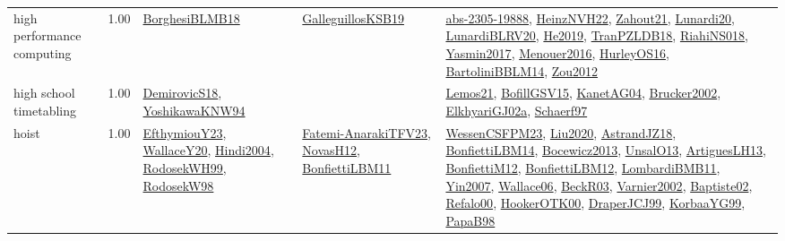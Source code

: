 {\begin{longtable}{p{3cm}r>{\raggedright\arraybackslash}p{6cm}>{\raggedright\arraybackslash}p{6cm}>{\raggedright\arraybackslash}p{8cm}}
\index{high performance computing}\index{ApplicationAreas!high performance computing}high performance computing &  1.00 & \hyperref[detail:BorghesiBLMB18]{BorghesiBLMB18} & \hyperref[detail:GalleguillosKSB19]{GalleguillosKSB19} & \hyperref[detail:abs-2305-19888]{abs-2305-19888}, \hyperref[detail:HeinzNVH22]{HeinzNVH22}, \hyperref[detail:Zahout21]{Zahout21}, \hyperref[detail:Lunardi20]{Lunardi20}, \hyperref[detail:LunardiBLRV20]{LunardiBLRV20}, \hyperref[detail:He2019]{He2019}, \hyperref[detail:TranPZLDB18]{TranPZLDB18}, \hyperref[detail:RiahiNS018]{RiahiNS018}, \hyperref[detail:Yasmin2017]{Yasmin2017}, \hyperref[detail:Menouer2016]{Menouer2016}, \hyperref[detail:HurleyOS16]{HurleyOS16}, \hyperref[detail:BartoliniBBLM14]{BartoliniBBLM14}, \hyperref[detail:Zou2012]{Zou2012}\\
\index{high school timetabling}\index{ApplicationAreas!high school timetabling}high school timetabling &  1.00 & \hyperref[detail:DemirovicS18]{DemirovicS18}, \hyperref[detail:YoshikawaKNW94]{YoshikawaKNW94} &  & \hyperref[detail:Lemos21]{Lemos21}, \hyperref[detail:BofillGSV15]{BofillGSV15}, \hyperref[detail:KanetAG04]{KanetAG04}, \hyperref[detail:Brucker2002]{Brucker2002}, \hyperref[detail:ElkhyariGJ02a]{ElkhyariGJ02a}, \hyperref[detail:Schaerf97]{Schaerf97}\\
\index{hoist}\index{ApplicationAreas!hoist}hoist &  1.00 & \hyperref[detail:EfthymiouY23]{EfthymiouY23}, \hyperref[detail:WallaceY20]{WallaceY20}, \hyperref[detail:Hindi2004]{Hindi2004}, \hyperref[detail:RodosekWH99]{RodosekWH99}, \hyperref[detail:RodosekW98]{RodosekW98} & \hyperref[detail:Fatemi-AnarakiTFV23]{Fatemi-AnarakiTFV23}, \hyperref[detail:NovasH12]{NovasH12}, \hyperref[detail:BonfiettiLBM11]{BonfiettiLBM11} & \hyperref[detail:WessenCSFPM23]{WessenCSFPM23}, \hyperref[detail:Liu2020]{Liu2020}, \hyperref[detail:AstrandJZ18]{AstrandJZ18}, \hyperref[detail:BonfiettiLBM14]{BonfiettiLBM14}, \hyperref[detail:Bocewicz2013]{Bocewicz2013}, \hyperref[detail:UnsalO13]{UnsalO13}, \hyperref[detail:ArtiguesLH13]{ArtiguesLH13}, \hyperref[detail:BonfiettiM12]{BonfiettiM12}, \hyperref[detail:BonfiettiLBM12]{BonfiettiLBM12}, \hyperref[detail:LombardiBMB11]{LombardiBMB11}, \hyperref[detail:Yin2007]{Yin2007}, \hyperref[detail:Wallace06]{Wallace06}, \hyperref[detail:BeckR03]{BeckR03}, \hyperref[detail:Varnier2002]{Varnier2002}, \hyperref[detail:Baptiste02]{Baptiste02}, \hyperref[detail:Refalo00]{Refalo00}, \hyperref[detail:HookerOTK00]{HookerOTK00}, \hyperref[detail:DraperJCJ99]{DraperJCJ99}, \hyperref[detail:KorbaaYG99]{KorbaaYG99}, \hyperref[detail:PapaB98]{PapaB98}\\

\end{longtable}}
